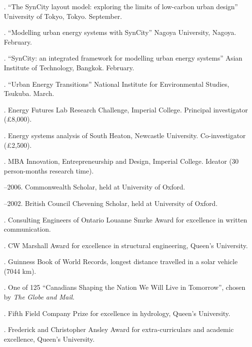 \documentclass[11pt,a4paper]{article}
\begin{document}
. ``The SynCity layout model: exploring the limits of low-carbon urban design'' University of Tokyo, Tokyo.  September.

. ``Modelling urban energy systems with SynCity'' Nagoya University, Nagoya. February.

. ``SynCity: an integrated framework for modelling urban energy systems'' Asian Institute of Technology, Bangkok. February.

. ``Urban Energy Transitions'' National Institute for Environmental Studies, Tsukuba.  March.


\bigskip

\noindent{}%
%
. Energy Futures Lab Research Challenge, Imperial College.  Principal investigator (£8,000).


. Energy systems analysis of South Heaton, Newcastle University.  Co-investigator (£2,500).

. MBA Innovation, Entrepreneurship and Design, Imperial College.  Ideator (30 person-months research time).

--2006.  Commonwealth Scholar, held at University of Oxford.

--2002.  British Council Chevening Scholar, held at University of Oxford.

.  Consulting Engineers of Ontario Louanne Smrke Award for excellence in written communication.

. CW Marshall Award for excellence in structural engineering, Queen's University.

.  Guinness Book of World Records, longest distance travelled in a solar vehicle (7044 km).

. One of 125 ``Canadians Shaping the Nation We Will Live in Tomorrow'', chosen by \emph{The Globe and Mail}.

.  Fifth Field Company Prize for excellence in hydrology, Queen's University.

. Frederick and Christopher Ansley Award for extra-curriculars and academic excellence, Queen's University.
\end{document}

